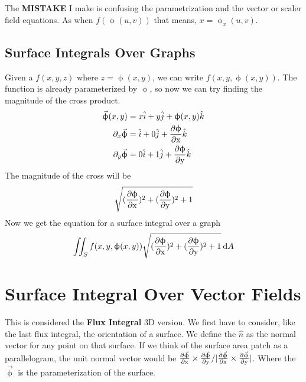 The \textbf{MISTAKE} I make is confusing the parametrization and the vector or scaler field equations.
As when $f(\upphi(u,v))$ that means, $x=\upphi_x(u,v)$.

\subsection{Surface Integrals Over Graphs}
Given a $f(x,y,z)$ where $z=\upphi(x,y)$, we can write $f(x,y,\upphi(x,y))$. The function is already parameterized by $\upphi$, so now we can try finding the magnitude of the cross product.
\begin{align*}
	\vec{\upphi}(x,y) &= x\hat{i} + y\hat{j} + \upphi(x,y)\hat{k} \\ 
	\partial_x\vec{\upphi} &= \hat{i} + 0\hat{j} + \frac{\partial \upphi}{\partial\mathrm{x}}\hat{k} \\  
	\partial_y\vec{\upphi} &= 0\hat{i} + 1\hat{j} + \frac{\partial \upphi}{\partial\mathrm{y}}\hat{k} 
\end{align*}
The magnitude of the cross will be 
\begin{equation*}
	\sqrt{(\frac{\partial \upphi}{\partial\mathrm{x}})^2+(\frac{\partial \upphi}{\partial\mathrm{y}})^2+1}
\end{equation*}
Now we get the equation for a surface integral over a graph 
\begin{equation*}
	\iint_S f(x,y,\upphi(x,y))	\sqrt{(\frac{\partial \upphi}{\partial\mathrm{x}})^2+(\frac{\partial \upphi}{\partial\mathrm{y}})^2+1} \: \mathrm{d}A
\end{equation*}

\section{Surface Integral Over Vector Fields}
This is considered the \textbf{Flux Integral} 3D version. We first have to consider, like the last flux integral, the orientation of a surface. We define the $\hat{n}$ as the normal vector for any point on that surface. If we think of the surface area patch as a parallelogram, the unit normal vector would be 
${\frac{\partial \vec{\upphi}}{\partial\mathrm{x}} \times \frac{\partial \vec{\upphi}}{\partial\mathrm{y}}}/{|\frac{\partial \vec{\upphi}}{\partial\mathrm{x}} \times \frac{\partial \vec{\upphi}}{\partial\mathrm{y}}|}$. Where the $\vec{\upphi}$ is the parameterization of the surface.

